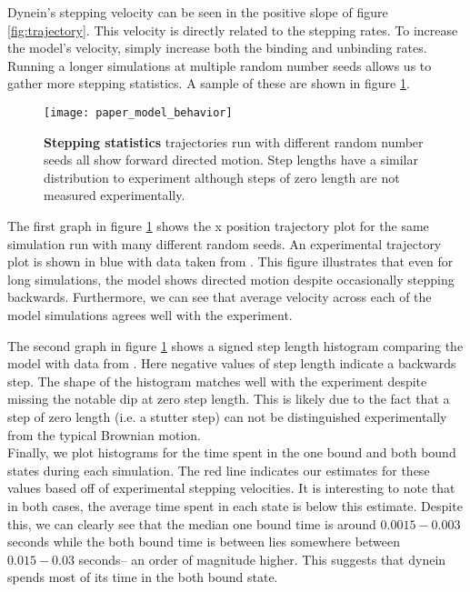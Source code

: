 Dynein's stepping velocity can be seen in the positive slope of figure \ref{fig:trajectory}. This velocity is directly related to the stepping rates. To increase the model's velocity, simply increase both the binding and unbinding rates. \\ 

Running a longer simulations at multiple random number seeds allows us to gather more stepping statistics. A sample of these are shown in figure \ref{fig:statistics}. 
	
\begin{figure}
	\centering
	\texttt{[image: paper\_model\_behavior]}
	\caption[Model Stepping Statistics]{\textbf{Stepping statistics} trajectories run with different random number seeds all show forward directed motion. Step lengths have a similar distribution to experiment although steps of zero length are not measured experimentally. }
	\label{fig:statistics}
\end{figure}


The first graph in figure \ref{fig:statistics} shows the x position trajectory plot for the same simulation run with many different random seeds. An experimental trajectory plot is shown in blue with data taken from \cite{dewitt2012cytoplasmic}. This figure illustrates that even for long simulations, the model shows directed motion despite occasionally stepping backwards. Furthermore, we can see that average velocity across each of the model simulations agrees well with the experiment. 

The second graph in figure \ref{fig:statistics} shows a signed step length histogram comparing the model with data from \cite{qiu2012dynein}. Here negative values of step length indicate a backwards step. The shape of the histogram matches well with the experiment despite missing the notable dip at zero step length. This is likely due to the fact that a step of zero length (i.e. a stutter step) can not be distinguished experimentally from the typical Brownian motion. \\ 

Finally, we plot histograms for the time spent in the one bound and both bound states during each simulation. The red line indicates our estimates for these values based off of experimental stepping velocities. It is interesting to note that in both cases, the average time spent in each state is below this estimate. Despite this, we can clearly see that the median one bound time is around $0.0015-0.003$ seconds while the both bound time is between lies somewhere between $0.015-0.03$ seconds-- an order of magnitude higher. This suggests that dynein spends most of its time in the both bound state. 


